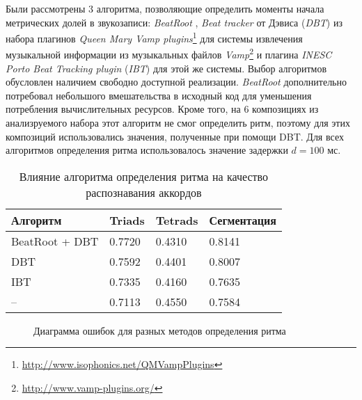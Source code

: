 Были рассмотрены 3 алгоритма, позволяющие определить моменты начала метрических
долей в звукозаписи: \emph{BeatRoot} \cite{Dixon2007}, \emph{Beat tracker} от
Дэвиса \cite{Davies2007} (\emph{DBT}) из набора плагинов \emph{Queen Mary Vamp
plugins}\footnote{\url{http://www.isophonics.net/QMVampPlugins}} для системы
извлечения музыкальной информации из музыкальных файлов
\emph{Vamp}\footnote{\url{http://www.vamp-plugins.org/}} и плагина \emph{INESC
Porto Beat Tracking plugin} \cite{Oliveira2012} (\emph{IBT}) для этой же
системы. Выбор алгоритмов обусловлен наличием свободно доступной реализации.
\emph{BeatRoot} дополнительно потребовал небольшого вмешательства в исходный
код для уменьшения потребления вычислительных ресурсов. Кроме того, на 6
композициях из анализруемого набора этот алгоритм не смог определить ритм,
поэтому для этих композиций использовались значения, полученные при помощи DBT.
Для всех алгоритмов определения ритма использовалось значение задержки $d=100$
мс.

\begin{table} [htbp]
  \centering
  \parbox{15cm}{\caption{Влияние алгоритма определения ритма на
  качество распознавания аккордов} \label{TBT}}
  \begin{tabular}{|l|l|l|l|}
  \hline
  Алгоритм & Triads & Tetrads & Сегментация \\
  \hline
  BeatRoot + DBT & 0.7720 & 0.4310 & 0.8141 \\
  DBT & 0.7592 & 0.4401 & 0.8007 \\
  IBT & 0.7335 & 0.4160 & 0.7635 \\
  -- & 0.7113 & 0.4550 & 0.7584 \\
  \hline
  \end{tabular}
\end{table}

\begin{figure}[htbp]
  \begin{minipage}[h]{0.49\linewidth}
  \end{minipage}
  \hfill
  \begin{minipage}[h]{0.49\linewidth}
  \end{minipage}
  \caption{Диаграмма ошибок для разных методов определения ритма}
  \label{img:beattracker}
\end{figure}

